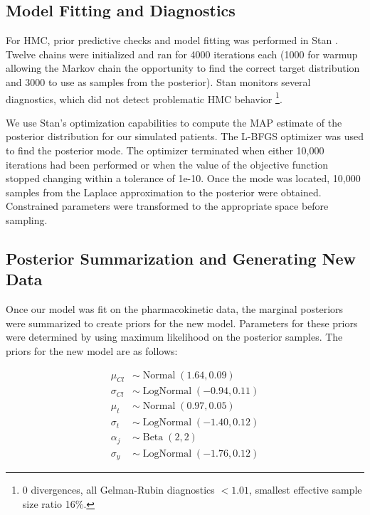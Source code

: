 \subsection*{Model Fitting and Diagnostics}

For HMC, prior predictive checks and model fitting was performed in Stan \cite{Carpenter2017-qf}.  Twelve chains were initialized and ran for 4000 iterations each (1000 for warmup allowing the Markov chain the opportunity to find the correct target distribution and 3000 to use as samples from the posterior). Stan monitors several diagnostics, which did not detect problematic HMC behavior \footnote{0 divergences, all Gelman-Rubin diagnostics $<1.01$, smallest effective sample size ratio 16\%.}.

We use Stan’s optimization capabilities to compute the MAP estimate of the posterior distribution for our simulated patients.  The L-BFGS optimizer was used to find the posterior mode.  The optimizer terminated when either 10,000 iterations had been performed or when the value of the objective function stopped changing within a tolerance of 1e-10. Once the mode was located, 10,000 samples from the Laplace approximation to the posterior were obtained. Constrained parameters were transformed to the appropriate space before sampling.

\subsection*{Posterior Summarization and Generating New Data}

Once our model was fit on the pharmacokinetic data, the marginal posteriors were summarized to create priors for the new model.  Parameters for these priors were determined by using maximum likelihood on the posterior samples.  The priors for the new model are as follows:

\begin{align}
	\mu_{Cl} &\sim \operatorname{Normal}(1.64, 0.09)  \label{eq:eq_18} \\
	\sigma_{Cl} &\sim \operatorname{LogNormal}(-0.94, 0.11)  \label{eq:eq_19} \\
	\mu_{t} &\sim \operatorname{Normal}(0.97, 0.05)   \label{eq:eq_20} \\
	\sigma_{t} &\sim \operatorname{LogNormal}(-1.40, 0.12)  \label{eq:eq_21} \\
	\alpha_j &\sim \operatorname{Beta}(2,2)  \label{eq:eq_22} \\
	\sigma_y &\sim \operatorname{LogNormal}(-1.76, 0.12)  \label{eq:eq_23}
\end{align}

